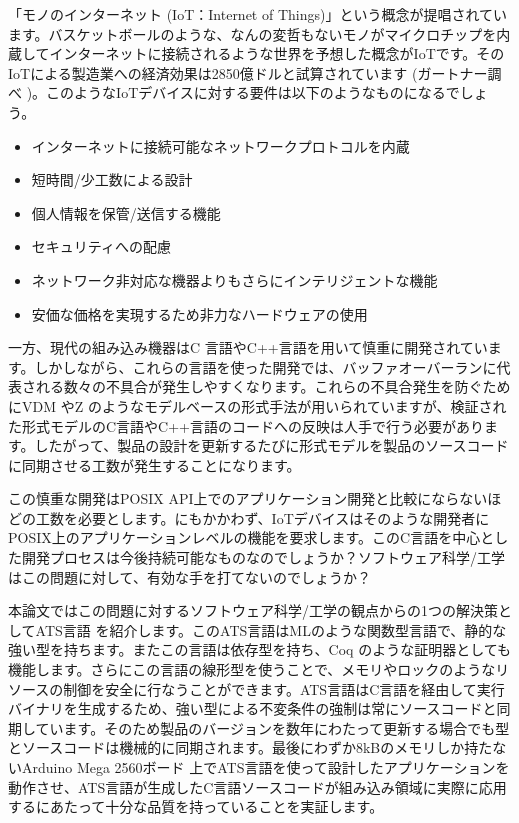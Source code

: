 \documentclass{ipsjprosym}
\begin{document}
「モノのインターネット (IoT：Internet of Things)」という概念が提唱されています。バスケットボールのような、なんの変哲もないモノがマイクロチップを内蔵してインターネットに接続されるような世界を予想した概念がIoTです。そのIoTによる製造業への経済効果は2850億ドルと試算されています (ガートナー調べ \cite{iot_monoist})。このようなIoTデバイスに対する要件は以下のようなものになるでしょう。

\begin{itemize}
\item インターネットに接続可能なネットワークプロトコルを内蔵
\item 短時間/少工数による設計
\item 個人情報を保管/送信する機能
\item セキュリティへの配慮
\item ネットワーク非対応な機器よりもさらにインテリジェントな機能
\item 安価な価格を実現するため非力なハードウェアの使用
\end{itemize}

一方、現代の組み込み機器はC 言語やC++言語を用いて慎重に開発されています。しかしながら、これらの言語を使った開発では、バッファオーバーランに代表される数々の不具合が発生しやすくなります。これらの不具合発生を防ぐためにVDM \cite{vdm} やZ \cite{z_notation} のようなモデルベースの形式手法が用いられていますが、検証された形式モデルのC言語やC++言語のコードへの反映は人手で行う必要があります。したがって、製品の設計を更新するたびに形式モデルを製品のソースコードに同期させる工数が発生することになります。

この慎重な開発はPOSIX API上でのアプリケーション開発と比較にならないほどの工数を必要とします。にもかかわず、IoTデバイスはそのような開発者にPOSIX上のアプリケーションレベルの機能を要求します。このC言語を中心とした開発プロセスは今後持続可能なものなのでしょうか？ソフトウェア科学/工学はこの問題に対して、有効な手を打てないのでしょうか？

本論文ではこの問題に対するソフトウェア科学/工学の観点からの1つの解決策としてATS言語 \cite{ats} を紹介します。このATS言語はMLのような関数型言語で、静的な強い型を持ちます。またこの言語は依存型を持ち、Coq \cite{Coq_manual} のような証明器としても機能します。さらにこの言語の線形型を使うことで、メモリやロックのようなリソースの制御を安全に行なうことができます。ATS言語はC言語を経由して実行バイナリを生成するため、強い型による不変条件の強制は常にソースコードと同期しています。そのため製品のバージョンを数年にわたって更新する場合でも型とソースコードは機械的に同期されます。最後にわずか8kBのメモリしか持たないArduino Mega 2560ボード \cite{arduino-mega} 上でATS言語を使って設計したアプリケーションを動作させ、ATS言語が生成したC言語ソースコードが組み込み領域に実際に応用するにあたって十分な品質を持っていることを実証します。
\end{document}
